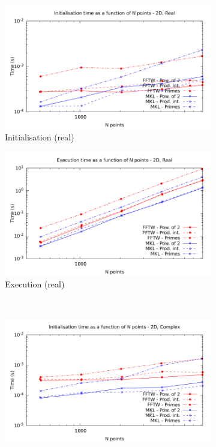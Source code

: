 \documentclass[12pt, a4paper]{article} \setlength{\textheight}{24cm}
\begin{document}
\begin{figure}[H]
  \centering
  \begin{subfigure}{.5\textwidth}
    \centering
    \includegraphics[width=.9\linewidth]{graphs/2d-init-r.pdf}
    \caption{Initialisation (real)}
    \label{2DRI}
  \end{subfigure}%
  \begin{subfigure}{.5\textwidth}
    \centering
    \includegraphics[width=.9\linewidth]{graphs/2d-exec-r.pdf}
    \caption{Execution (real)}
    \label{2DR}
  \end{subfigure}\\
  \begin{subfigure}{.5\textwidth}
    \centering
    \includegraphics[width=.9\linewidth]{graphs/2d-init-c.pdf}

\end{subfigure}
\end{figure}
\end{document}
